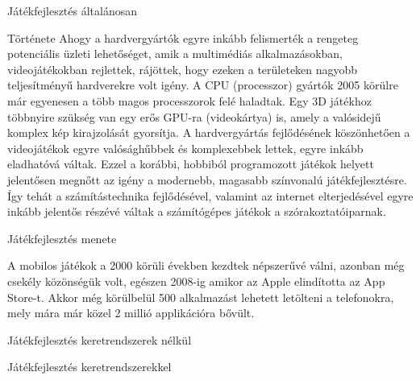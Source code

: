 \begin{MyChapter}{Játékfejlesztés általánosan}
\begin{MySection}{Története}
		Ahogy a hardvergyártók egyre inkább felismerték a rengeteg potenciális üzleti lehetőséget, amik a multimédiás alkalmazásokban, videojátékokban rejlettek, rájöttek, hogy ezeken a területeken nagyobb teljesítményű hardverekre volt igény. A CPU (processzor) gyártók 2005 körülre már egyenesen a több magos processzorok felé haladtak. Egy 3D játékhoz többnyire szükség van egy erős GPU-ra (videokártya) is, amely a valósidejű komplex kép kirajzolását gyorsítja.
		A hardvergyártás fejlődésének köszönhetően a videojátékok egyre valósághűbbek és komplexebbek lettek, egyre inkább eladhatóvá váltak. Ezzel a korábbi, hobbiból programozott játékok helyett jelentősen megnőtt az igény a modernebb, magasabb színvonalú játékfejlesztésre. Így tehát a számítástechnika fejlődésével, valamint az internet elterjedésével egyre inkább jelentős részévé váltak a számítógépes játékok a szórakoztatóiparnak.
		
	\end{MySection}

	\begin{MySection}{Játékfejlesztés menete} 
		
		A mobilos játékok a 2000 körüli években kezdtek népszerűvé válni, azonban még csekély közönségük volt, egészen 2008-ig amikor az Apple elindította az App Store-t. Akkor még körülbelül 500 alkalmazást lehetett letölteni a telefonokra, mely mára már közel 2 millió applikációra bővült.
		
		
		
	\end{MySection}

	\begin{MySection}{Játékfejlesztés keretrendszerek nélkül}
	\end{MySection}

	\begin{MySection}{Játékfejlesztés keretrendszerekkel}
		

\end{MySection}
\end{MyChapter}
